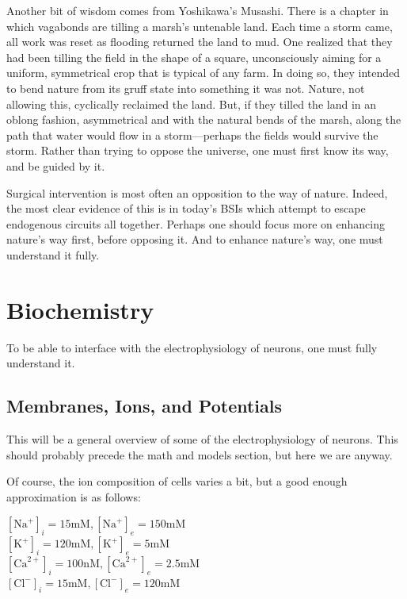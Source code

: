 \documentclass[12pt]{report}
\begin{document}
Another bit of wisdom comes from Yoshikawa's Musashi. There is a chapter in which vagabonds are tilling a marsh's untenable land. Each time a storm came, all work was reset as flooding returned the land to mud. One realized that they had been tilling the field in the shape of a square, unconsciously aiming for a uniform, symmetrical crop that is typical of any farm. In doing so, they intended to bend nature from its gruff state into something it was not. Nature, not allowing this, cyclically reclaimed the land. But, if they tilled the land in an oblong fashion, asymmetrical and with the natural bends of the marsh, along the path that water would flow in a storm---perhaps the fields would survive the storm. Rather than trying to oppose the universe, one must first know its way, and be guided by it.\newline

Surgical intervention is most often an opposition to the way of nature. Indeed, the most clear evidence of this is in today's BSIs which attempt to escape endogenous circuits all together. Perhaps one should focus more on enhancing nature's way first, before opposing it. And to enhance nature's way, one must understand it fully. 

\chapter{Biochemistry}

To be able to interface with the electrophysiology of neurons, one must fully understand it. 

\section{Membranes, Ions, and Potentials}

This will be a general overview of some of the electrophysiology of neurons. This should probably precede the math and models section, but here we are anyway.\newline

Of course, the ion composition of cells varies a bit, but a good enough approximation is as follows:\newline 


$[\mathrm{Na}^+]_i = 15\mathrm{mM}, [\mathrm{Na}^+]_e = 150\mathrm{mM}$\\
$[\mathrm{K}^+]_i = 120\mathrm{mM}, [\mathrm{K}^+]_e = 5\mathrm{mM}$ \\
$[\mathrm{Ca}^{2+}]_i = 100\mathrm{nM}, 
[\mathrm{Ca}^{2+}]_e = 2.5\mathrm{mM}$\\
$[\mathrm{Cl}^-]_i = 15\mathrm{mM}, [\mathrm{Cl}^-]_e = 120\mathrm{mM}$ 
\newline
\end{document}
